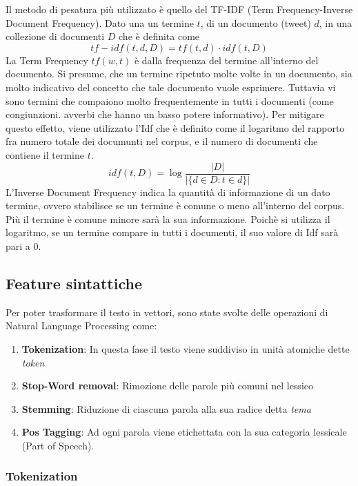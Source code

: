 Il metodo di pesatura più utilizzato è quello del TF-IDF (Term Frequency-Inverse Document Frequency).
Dato una un termine  $t$, di un documento (tweet) $d$, in una collezione di documenti $D$
che è definita come  
\begin{equation}
tf-idf(t,d, D) =  tf(t,d)\cdot idf(t,D)
\end{equation}
La Term Frequency $tf(w,t)$ è dalla frequenza del termine all'interno del documento. Si presume, che un termine     ripetuto molte volte in un documento, sia molto indicativo del concetto che tale documento vuole esprimere.
Tuttavia vi sono termini che compaiono molto frequentemente in tutti i documenti (come congiunzioni. avverbi che hanno un basso potere informativo).
Per  mitigare questo effetto, viene utilizzato l'Idf che è definito come il logaritmo del rapporto fra numero totale dei documunti nel corpus, e il numero di documenti che contiene il termine $t$.
\begin{equation}
idf(t, D) =  \log \frac{|D|}{|\{d \in D: t \in d\}|}
\end{equation}
L'Inverse Document Frequency   indica la quantità di informazione di un dato termine, ovvero stabilisce se un termine è comune o meno all'interno del corpus. Più il termine è comune minore sarà la sua informazione. 
Poichè si utilizza il logaritmo, se un termine compare in tutti i documenti, il suo valore di Idf sarà pari a 0.

\subsection{Feature sintattiche}
Per poter trasformare il testo in vettori, sono state svolte delle operazioni di Natural Language Processing come:
\begin{enumerate}
\item \textbf{Tokenization}: In questa fase il testo viene suddiviso in unità atomiche dette \emph{token}
\item \textbf{Stop-Word removal}: Rimozione delle parole più comuni nel lessico
\item \textbf{Stemming}: Riduzione di ciascuna parola alla sua radice detta \emph{tema}
\item \textbf{Pos Tagging}: Ad ogni parola viene etichettata con la sua categoria lessicale (Part of Speech).
\end{enumerate}
\subsubsection{Tokenization}

